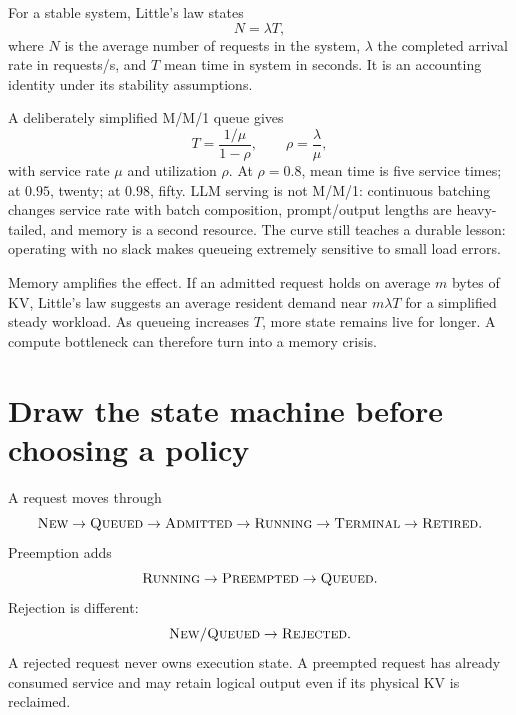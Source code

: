 

For a stable system, Little's law states
\begin{equation}
N=\lambda T,
\end{equation}
where $N$ is the average number of requests in the system, $\lambda$ the completed
arrival rate in requests/s, and $T$ mean time in system in seconds. It is an accounting
identity under its stability assumptions.

A deliberately simplified M/M/1 queue gives
\begin{equation}
T=\frac{1/\mu}{1-\rho},\qquad \rho=\frac{\lambda}{\mu},
\label{eq:sched-mm1}
\end{equation}
with service rate $\mu$ and utilization $\rho$. At $\rho=0.8$, mean time is five
service times; at $0.95$, twenty; at $0.98$, fifty. LLM serving is not M/M/1:
continuous batching changes service rate with batch composition, prompt/output
lengths are heavy-tailed, and memory is a second resource. The curve still teaches a
durable lesson: operating with no slack makes queueing extremely sensitive to small
load errors.

Memory amplifies the effect. If an admitted request holds on average $m$ bytes of KV,
Little's law suggests an average resident demand near $m\lambda T$ for a simplified
steady workload. As queueing increases $T$, more state remains live for longer. A
compute bottleneck can therefore turn into a memory crisis.

\section{Draw the state machine before choosing a policy}

A request moves through
\[
\textsc{New}\rightarrow\textsc{Queued}\rightarrow\textsc{Admitted}
\rightarrow\textsc{Running}\rightarrow\textsc{Terminal}\rightarrow\textsc{Retired}.
\]
Preemption adds
\[
\textsc{Running}\rightarrow\textsc{Preempted}\rightarrow\textsc{Queued}.
\]
Rejection is different:
\[
\textsc{New/Queued}\rightarrow\textsc{Rejected}.
\]
A rejected request never owns execution state. A preempted request has already
consumed service and may retain logical output even if its physical KV is reclaimed.

